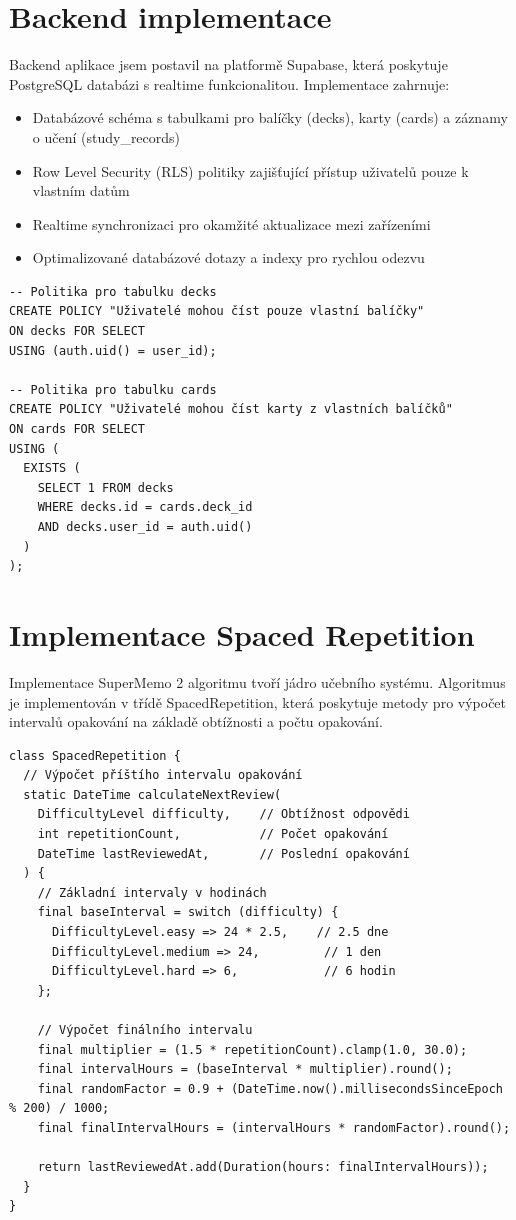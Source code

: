 \documentclass[12pt, a4paper, oneside]{report}
\begin{document}
	\section{Backend implementace}
	Backend aplikace jsem postavil na platformě Supabase, která poskytuje PostgreSQL databázi s realtime funkcionalitou. Implementace zahrnuje:

	\begin{itemize}
		\item Databázové schéma s tabulkami pro balíčky (decks), karty (cards) a záznamy o učení (study\_records)
		\item Row Level Security (RLS) politiky zajišťující přístup uživatelů pouze k vlastním datům
		\item Realtime synchronizaci pro okamžité aktualizace mezi zařízeními
		\item Optimalizované databázové dotazy a indexy pro rychlou odezvu
	\end{itemize}

	\begin{lstlisting}[style=Python, caption=Ukázka RLS politik]
-- Politika pro tabulku decks
CREATE POLICY "Uživatelé mohou číst pouze vlastní balíčky"
ON decks FOR SELECT
USING (auth.uid() = user_id);

-- Politika pro tabulku cards
CREATE POLICY "Uživatelé mohou číst karty z vlastních balíčků"
ON cards FOR SELECT
USING (
  EXISTS (
    SELECT 1 FROM decks
    WHERE decks.id = cards.deck_id
    AND decks.user_id = auth.uid()
  )
);
	\end{lstlisting}

	\section{Implementace Spaced Repetition}
	Implementace SuperMemo 2 algoritmu tvoří jádro učebního systému. Algoritmus je implementován v třídě SpacedRepetition, která poskytuje metody pro výpočet intervalů opakování na základě obtížnosti a počtu opakování.

	\begin{lstlisting}[style=Python, caption=Implementace algoritmu Spaced Repetition]
class SpacedRepetition {
  // Výpočet příštího intervalu opakování
  static DateTime calculateNextReview(
    DifficultyLevel difficulty,    // Obtížnost odpovědi
    int repetitionCount,           // Počet opakování
    DateTime lastReviewedAt,       // Poslední opakování
  ) {
    // Základní intervaly v hodinách
    final baseInterval = switch (difficulty) {
      DifficultyLevel.easy => 24 * 2.5,    // 2.5 dne
      DifficultyLevel.medium => 24,         // 1 den
      DifficultyLevel.hard => 6,            // 6 hodin
    };

    // Výpočet finálního intervalu
    final multiplier = (1.5 * repetitionCount).clamp(1.0, 30.0);
    final intervalHours = (baseInterval * multiplier).round();
    final randomFactor = 0.9 + (DateTime.now().millisecondsSinceEpoch % 200) / 1000;
    final finalIntervalHours = (intervalHours * randomFactor).round();

    return lastReviewedAt.add(Duration(hours: finalIntervalHours));
  }
}
	\end{lstlisting}
\end{document}
